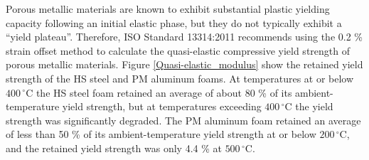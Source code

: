 \documentclass[review]{elsarticle}
\begin{document}
{Porous metallic materials are known to exhibit substantial plastic yielding capacity following an initial elastic phase, but they do not typically exhibit a “yield plateau”. Therefore, ISO Standard 13314:2011 recommends using the 0.2 \% strain offset method to calculate the quasi-elastic compressive yield strength of porous metallic materials. Figure \ref{Quasi-elastic_modulus} show the retained yield strength of the HS steel and PM aluminum foams. At temperatures at or below $400\,^{\circ}\mathrm{C}$ the HS steel foam retained an average of about 80 \% of its ambient-temperature yield strength, but at temperatures exceeding $400\,^{\circ}\mathrm{C}$ the yield strength was significantly degraded. The PM aluminum foam retained an average of less than 50 \% of its ambient-temperature yield strength at or below $200\,^{\circ}\mathrm{C}$, and the retained yield strength was only 4.4 \% at $500\,^{\circ}\mathrm{C}$.

}
\end{document}
